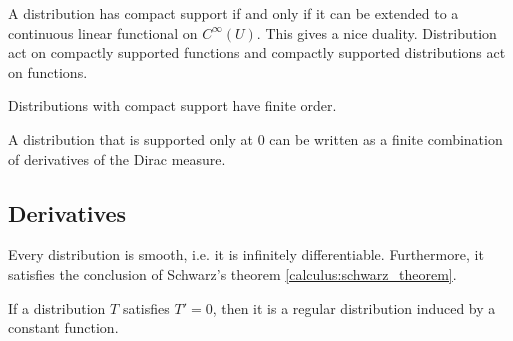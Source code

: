 
	\begin{property}
		A distribution has compact support if and only if it can be extended to a continuous linear functional on $C^\infty(U)$. This gives a nice duality. Distribution act on compactly supported functions and compactly supported distributions act on functions.
	\end{property}

	\begin{property}[Order]
		Distributions with compact support have finite order.
	\end{property}

	\begin{property}
		A distribution that is supported only at 0 can be written as a finite combination of derivatives of the Dirac measure.
	\end{property}

\subsection{Derivatives}


	\begin{property}
		Every distribution is smooth, i.e. it is infinitely differentiable. Furthermore, it satisfies the conclusion of Schwarz's theorem \ref{calculus:schwarz_theorem}.
	\end{property}
    \begin{property}
        If a distribution $T$ satisfies $T'=0$, then it is a regular distribution induced by a constant function.
    \end{property}

